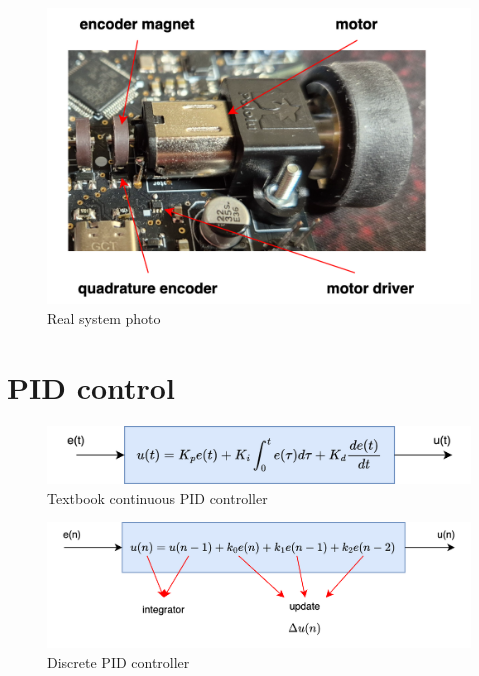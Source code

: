 \documentclass[12pt,twoside,onecolumn,openany,extrafontsizes,dvipsnames]{memoir}
\begin{document}
    \begin{figure}[!htb]
        \centering
        \includegraphics[scale=0.8]{../diagrams/control_generic/control_generic-motor_control_photo.png}
        \caption{Real system photo}
        \label{fig:velocity_control_real}
    \end{figure}




    \newpage
    \section{PID control}

        \begin{figure}[!htb]
            \centering
            \includegraphics[scale=0.8]{../diagrams/control_generic/control_generic-pid.png}
            \caption{Textbook continuous PID controller}
            \label{fig:textbook_continuous_pid_controller}
        \end{figure}

        \begin{figure}[!htb]
            \centering
            \includegraphics[scale=0.8]{../diagrams/control_generic/control_generic-pid_discrete.png}
            \caption{Discrete PID controller }
            \label{fig:discrete_pid_controller}
        \end{figure}
\end{document}
